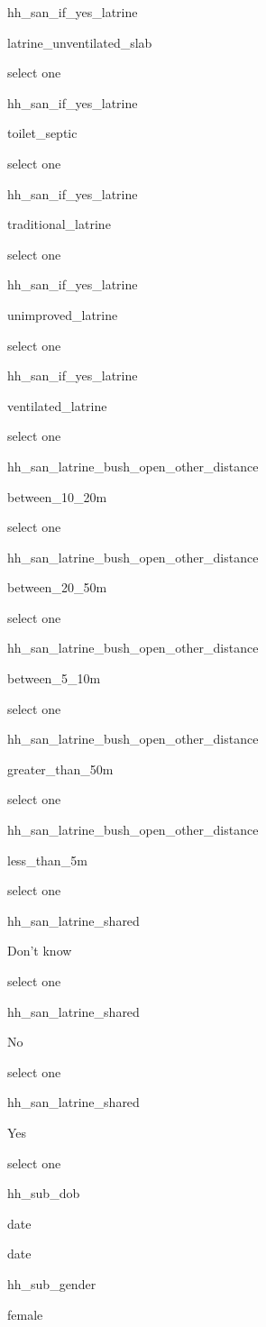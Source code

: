 \documentclass[]{article}
\begin{document}
hh\_san\_if\_yes\_latrine

latrine\_unventilated\_slab

select one

hh\_san\_if\_yes\_latrine

toilet\_septic

select one

hh\_san\_if\_yes\_latrine

traditional\_latrine

select one

hh\_san\_if\_yes\_latrine

unimproved\_latrine

select one

hh\_san\_if\_yes\_latrine

ventilated\_latrine

select one

hh\_san\_latrine\_bush\_open\_other\_distance

between\_10\_20m

select one

hh\_san\_latrine\_bush\_open\_other\_distance

between\_20\_50m

select one

hh\_san\_latrine\_bush\_open\_other\_distance

between\_5\_10m

select one

hh\_san\_latrine\_bush\_open\_other\_distance

greater\_than\_50m

select one

hh\_san\_latrine\_bush\_open\_other\_distance

less\_than\_5m

select one

hh\_san\_latrine\_shared

Don't know

select one

hh\_san\_latrine\_shared

No

select one

hh\_san\_latrine\_shared

Yes

select one

hh\_sub\_dob

date

date

hh\_sub\_gender

female
\end{document}
